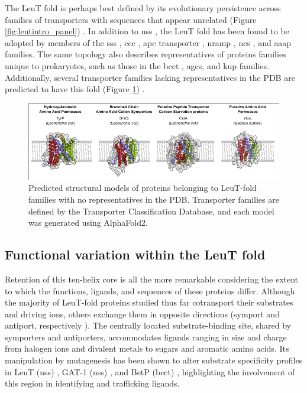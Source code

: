 The LeuT fold is perhaps best defined by its evolutionary persistence across families of transporters with sequences that appear unrelated (Figure \ref{fig:leutintro_panel}) \citep*{Abramson2009}. In addition to \gls{nss} \citep*{Cheng2019}, the LeuT fold has been found to be adopted by members of the \gls{sss} \citep*{Henriquez2021}, \gls{ccc} \citep*{Chew2021}, \gls{apc} transporter \citep*{ErrastiMurugarren2021}, \gls{nramp} \citep*{Bozzi2021}, \gls{ncs} \citep*{Patching2018}, and \gls{aaap} families. The same topology also describes representatives of proteins families unique to prokaryotes, such as those in the \gls{bcct} \citep*{Ziegler2010}, \gls{agcs}, and \gls{kup} families. Additionally, several transporter families lacking representatives in the PDB are predicted to have this fold (Figure \ref{fig:leutintro_unknowns}) \citep*{Saier2016, Tunyasuvunakool2021, Vastermark2014}.

\begin{figure}[h!]
\centering
\includegraphics[width=5.5in]{Figures/leutintro_unknowns.pdf}
 \caption[Predicted structural models of proteins belonging to LeuT-fold families with no representatives in the PDB.]{Predicted structural models of proteins belonging to LeuT-fold families with no representatives in the PDB. Transporter families are defined by the Transporter Classification Database, and each model was generated using AlphaFold2.}
\label{fig:leutintro_unknowns}
\end{figure}

\subsection{Functional variation within the LeuT fold}

Retention of this ten-helix core is all the more remarkable considering the extent to which the functions, ligands, and sequences of these proteins differ. Although the majority of LeuT-fold proteins studied thus far cotransport their substrates and driving ions, others exchange them in opposite directions (symport and antiport, respectively \citep*{Forrest2009}). The centrally located substrate-binding site, shared by symporters and antiporters, accommodates ligands ranging in size and charge from halogen ions and divalent metals to sugars and aromatic amino acids. Its manipulation by mutagenesis has been shown to alter substrate specificity profiles in LeuT (\gls{nss}) \citep*{Piscitelli2011, Zomot2007}, GAT-1 (\gls{nss}) \citep*{Zomot2007}, and BetP (\gls{bcct}) \citep*{Perez2014}, highlighting the involvement of this region in identifying and trafficking ligands.

